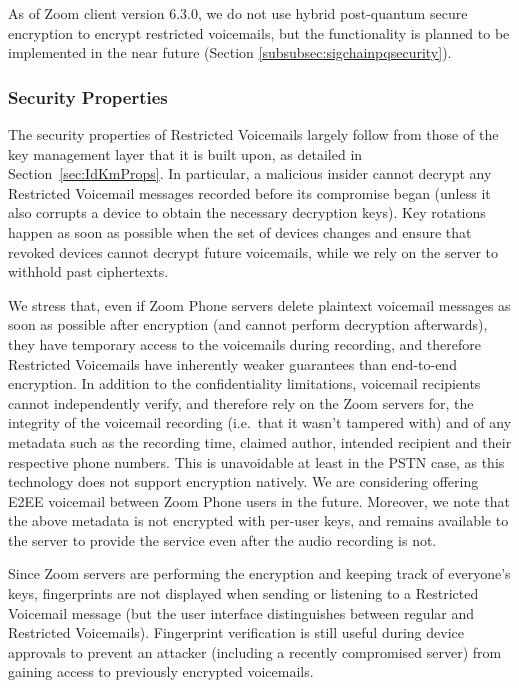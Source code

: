 As of Zoom client version 6.3.0, we do not use hybrid post-quantum secure encryption to encrypt
restricted voicemails, but the functionality is planned to be implemented in the near future
(Section \ref{subsubsec:sigchainpqsecurity}).

\subsubsection{Security Properties}
The security properties of Restricted Voicemails largely follow from those of the key management layer that it is
built upon, as detailed in Section~\ref{sec:IdKmProps}. In particular, a malicious insider cannot
decrypt any Restricted Voicemail messages recorded before its compromise began (unless it also
corrupts a device to obtain the necessary decryption keys). Key rotations happen as soon as possible
when the set of devices changes and ensure that revoked devices cannot decrypt future voicemails,
while we rely on the server to withhold past ciphertexts.

We stress that, even if Zoom Phone servers delete plaintext voicemail messages as soon as possible
after encryption (and cannot perform decryption afterwards), they have temporary access to the
voicemails during recording, and therefore Restricted Voicemails have inherently weaker guarantees than end-to-end
encryption. In addition to the confidentiality limitations, voicemail recipients cannot
independently verify, and therefore rely on the Zoom servers for, the integrity of the voicemail
recording (i.e.\ that it wasn't tampered with) and of any metadata such as the recording time,
claimed author, intended recipient and their respective phone numbers. This is unavoidable at least
in the PSTN case, as this technology does not support encryption natively. We are considering
offering E2EE voicemail between Zoom Phone users in the future. Moreover, we note that the above
metadata is not encrypted with per-user keys, and remains available to the server to provide the
service even after the audio recording is not.

Since Zoom servers are performing the encryption and keeping track of everyone's keys, fingerprints
are not displayed when sending or listening to a Restricted Voicemail message (but the user interface
distinguishes between regular and Restricted Voicemails). Fingerprint verification is still
useful during device approvals to prevent an attacker (including a recently compromised server) from
gaining access to previously encrypted voicemails.
